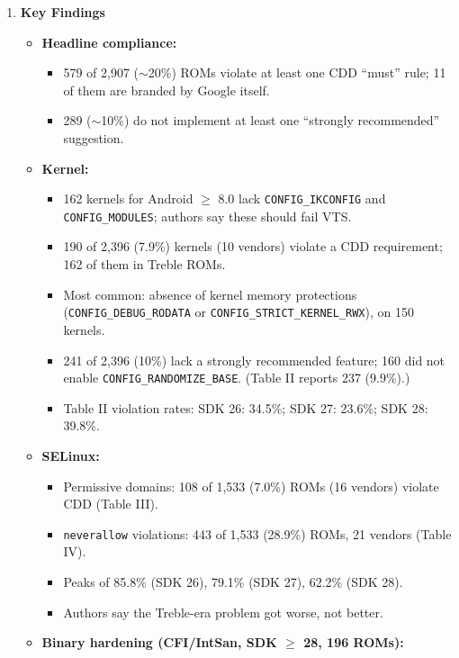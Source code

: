 \documentclass[11pt,a4paper]{article}
\newcommand{\entrypart}[1]{\textbf{\color{accent}#1}\par\vspace{2pt}}
\begin{document}
\begin{enumerate}
    \item \entrypart{Key Findings}

    \begin{itemize}[leftmargin=*,itemsep=1pt,topsep=2pt]
        \item \textbf{Headline compliance:}
        \begin{itemize}[itemsep=0pt]
            \item 579 of 2,907 ($\sim$20\%) ROMs violate at least one CDD ``must'' rule; 11 of them are branded by Google itself.
            \item 289 ($\sim$10\%) do not implement at least one ``strongly recommended'' suggestion.
        \end{itemize}
        \item \textbf{Kernel:}
        \begin{itemize}[itemsep=0pt]
            \item 162 kernels for Android $\geq$ 8.0 lack \texttt{CONFIG\_IKCONFIG} and \texttt{CONFIG\_MODULES}; authors say these should fail VTS.
            \item 190 of 2,396 (7.9\%) kernels (10 vendors) violate a CDD requirement; 162 of them in Treble ROMs.
            \item Most common: absence of kernel memory protections (\texttt{CONFIG\_DEBUG\_RODATA} or \texttt{CONFIG\_STRICT\_KERNEL\_RWX}), on 150 kernels.
            \item 241 of 2,396 (10\%) lack a strongly recommended feature; 160 did not enable \texttt{CONFIG\_RANDOMIZE\_BASE}. (Table II reports 237 (9.9\%).)
            \item Table II violation rates: SDK 26: 34.5\%; SDK 27: 23.6\%; SDK 28: 39.8\%.
        \end{itemize}
        \item \textbf{SELinux:}
        \begin{itemize}[itemsep=0pt]
            \item Permissive domains: 108 of 1,533 (7.0\%) ROMs (16 vendors) violate CDD (Table III).
            \item \texttt{neverallow} violations: 443 of 1,533 (28.9\%) ROMs, 21 vendors (Table IV).
            \item Peaks of 85.8\% (SDK 26), 79.1\% (SDK 27), 62.2\% (SDK 28).
            \item Authors say the Treble-era problem got worse, not better.
        \end{itemize}
        \item \textbf{Binary hardening (CFI/IntSan, SDK $\geq$ 28, 196 ROMs):}

\end{itemize}
\end{enumerate}
\end{document}
